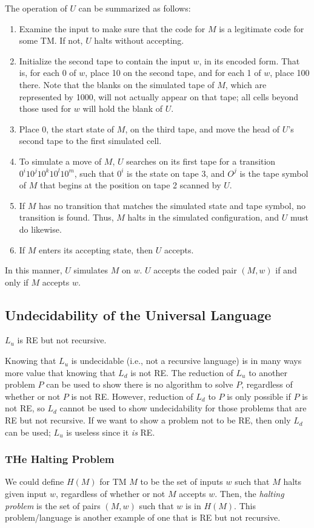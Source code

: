 \documentclass[]{article}
\begin{document}
The operation of $U$ can be summarized as follows:
\begin{enumerate}
\item Examine the input to make sure that the code for $M$ is a legitimate code
for some TM. If not, $U$ halts without accepting.
\item Initialize the second tape to contain the input $w$, in its encoded form.
That is, for each $0$ of $w$, place 10 on the second tape, and for each 1 of
$w$, place 100 there. Note that the blanks on the simulated tape of $M$, which
are represented by 1000, will not actually appear on that tape; all cells beyond
those used for $w$ will hold the blank of $U$.
\item Place 0, the start state of $M$, on the third tape, and move the head of
$U$'s second tape to the first simulated cell.
\item To simulate a move of $M$, $U$ searches on its first tape for a transition
$0^i10^j10^k10^l10^m$, such that $0^i$ is the state on tape 3, and $O^j$ is the
tape symbol of $M$ that begins at the position on tape 2 scanned by $U$.
\item If $M$ has no transition that matches the simulated state and tape symbol,
no transition is found. Thus, $M$ halts in the simulated configuration, and $U$
must do likewise.
\item If $M$ enters its accepting state, then $U$ accepts.
\end{enumerate}
In this manner, $U$ simulates $M$ on $w$. $U$ accepts the coded pair $(M, w)$ if
and only if $M$ accepts $w$.

\subsection*{Undecidability of the Universal Language}
\begin{thm}
$L_u$ is RE but not recursive.
\end{thm}
Knowing that $L_u$ is undecidable (i.e., not a recursive language) is in many
ways more value that knowing that $L_d$ is not RE. The reduction of $L_u$ to
another problem $P$ can be used to show there is no algorithm to solve $P$,
regardless of whether or not $P$ is not RE. However, reduction of $L_d$ to $P$
is only possible if $P$ is not RE, so $L_d$ cannot be used to show
undecidability for those problems that are RE but not recursive. If we want to
show a problem not to be RE, then only $L_d$ can be used; $L_u$ is useless since
it \emph{is} RE.

\subsubsection*{THe Halting Problem}
We could define $H(M)$ for TM $M$ to be the set of inputs $w$ such that $M$
halts given input $w$, regardless of whether or not $M$ accepts $w$. Then, the
\emph{halting problem} is the set of pairs $(M, w)$ such that $w$ is in $H(M)$.
This problem/language is another example of one that is RE but not recursive.
\end{document}
